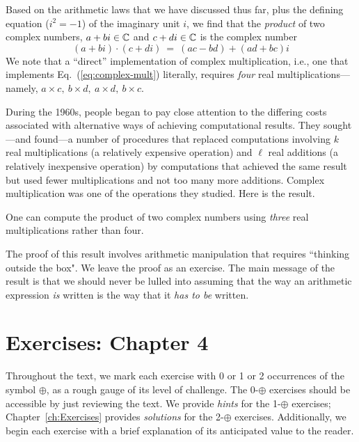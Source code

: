 \medskip

Based on the arithmetic laws that we have discussed thus far, plus the defining equation ($i^2 = -1$) of the imaginary unit $i$, we find that the {\em product} of two complex numbers, $a+bi \in \mathbb{C}$ and $c+di \in \mathbb{C}$ is the complex number
\begin{equation}
\label{eq:complex-mult}
(a+bi) \cdot (c+di) \ = \ (ac - bd) + (ad + bc)i
\end{equation}
We note that a ``direct'' implementation of complex multiplication, i.e., one that implements Eq.~(\ref{eq:complex-mult}) literally, requires {\em four} real multiplications---namely, $a \times c, \ b \times d, \ a \times d, \ b \times c$.

During the 1960s, people began to pay close attention to the differing costs associated with alternative ways of achieving computational results.  They sought---and found---a number of procedures that replaced computations involving $k$ real multiplications (a relatively expensive operation) and $\ell$ real additions (a relatively inexpensive operation) by computations that achieved the same result but used fewer multiplications and not too many more additions. Complex multiplication was one of the operations they studied.  Here is the result.

\begin{prop}
\label{thm:complex-mult-3real}
One can compute the product of two complex numbers using {\em three} real multiplications rather than four.
\end{prop}

The proof of this result involves arithmetic manipulation that requires ``thinking outside the box".  
We leave the proof as an exercise.  The main message of the result is that we should never be lulled into assuming that the way an arithmetic expression {\em is} written is the way that it {\em has to be} written.



\section{Exercises: Chapter 4}

Throughout the text, we mark each exercise with 0 or 1 or 2 occurrences of the symbol $\oplus$, as a rough gauge of its level of challenge.  The 0-$\oplus$ exercises should be accessible by just reviewing the text.  We provide {\em hints} for the 1-$\oplus$ exercises; Chapter~\ref{ch:Exercises} provides {\em solutions} for the 2-$\oplus$ exercises.  Additionally, we begin each exercise with a brief explanation of its anticipated value to the reader. 


